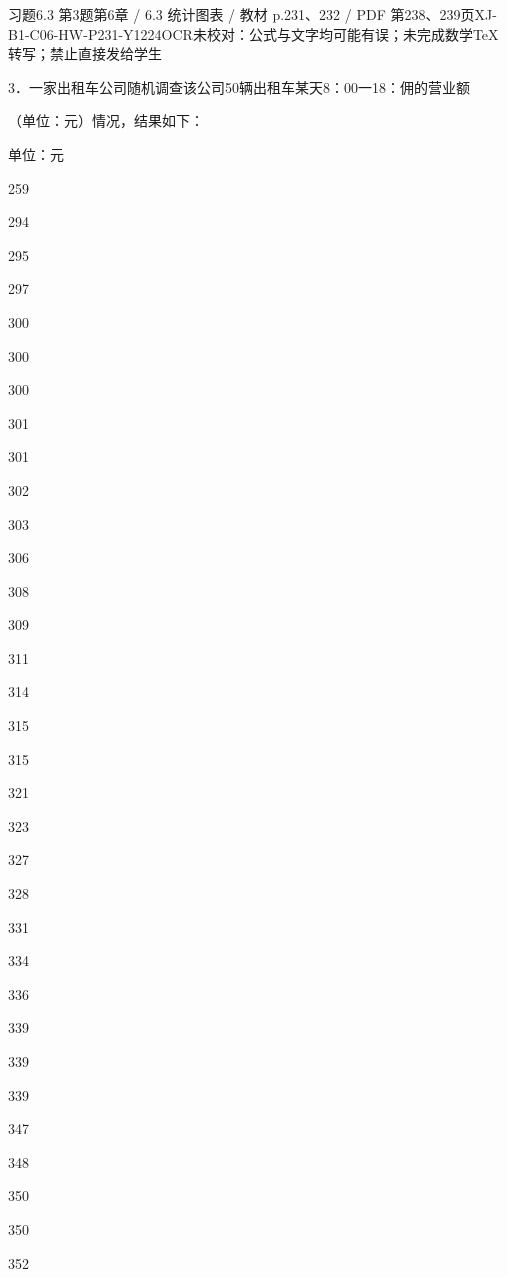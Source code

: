 \begin{bankitem}{习题6.3 第3题}{第6章 / 6.3 统计图表 / 教材 p.231、232 / PDF 第238、239页}{XJ-B1-C06-HW-P231-Y1224}{OCR未校对：公式与文字均可能有误；未完成数学TeX转写；禁止直接发给学生}
\begin{ocrdraft}
\par
3．一家出租车公司随机调查该公司50辆出租车某天8：00一18：佣的营业额
\par
（单位：元）情况，结果如下：
\par
单位：元
\par
259
\par
294
\par
295
\par
297
\par
300
\par
300
\par
300
\par
301
\par
301
\par
302
\par
303
\par
306
\par
308
\par
309
\par
311
\par
314
\par
315
\par
315
\par
321
\par
323
\par
327
\par
328
\par
331
\par
334
\par
336
\par
339
\par
339
\par
339
\par
347
\par
348
\par
350
\par
350
\par
352
\par

\end{ocrdraft}
\end{bankitem}
